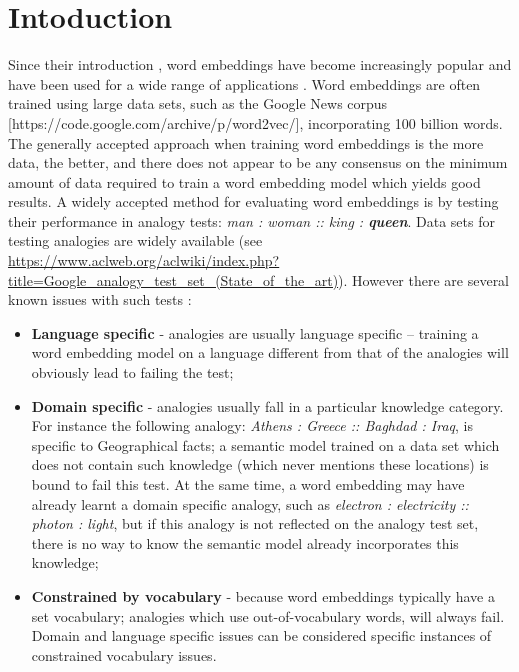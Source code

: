 \documentclass{article} %
\begin{document}
\section{Intoduction}
\label{sec:introduction}
Since their introduction \cite{Mikolov_CS2013}, word embeddings have become increasingly popular and have been used for a wide range of applications \cite{Mikolov_CoRR2013, Kim_CoRR2014, Levy_CNLL2014, Cordeiro_ACL2016, Smith_ICLR2017}. Word embeddings are often trained using large data sets, such as the Google News corpus [https://code.google.com/archive/p/word2vec/], incorporating 100 billion words. The generally accepted approach when training word embeddings is the more data, the better, and there does not appear to be any consensus on the minimum amount of data required to train a word embedding model which yields good results. A widely accepted method for evaluating word embeddings is by testing their performance in analogy tests: \textit{man : woman :: king : \textbf{queen}}. Data sets for testing analogies are widely available (see \url{https://www.aclweb.org/aclwiki/index.php?title=Google_analogy_test_set_(State_of_the_art)}). However there are several known issues with such tests \cite{Speer_Blog2016}:

\begin{itemize}
 \item \textbf{Language specific} - analogies are usually language specific -- training a word embedding model on a language different from that of the analogies will obviously lead to failing the test;
 \item \textbf{Domain specific} - analogies usually fall in a particular knowledge category. For instance the following analogy: \textit{Athens : Greece :: Baghdad : Iraq}, is specific to Geographical facts; a semantic model trained on a data set which does not contain such knowledge (which never mentions these locations) is bound to fail this test. At the same time, a word embedding may have already learnt a domain specific analogy, such as \textit{electron : electricity :: photon : light}, but if this analogy is not reflected on the analogy test set, there is no way to know the semantic model already incorporates this knowledge;
 \item \textbf{Constrained by vocabulary} - because word embeddings typically have a set vocabulary; analogies which use out-of-vocabulary words, will always fail. Domain and language specific issues can be considered specific instances of constrained vocabulary issues.
\end{itemize}
\end{document}
